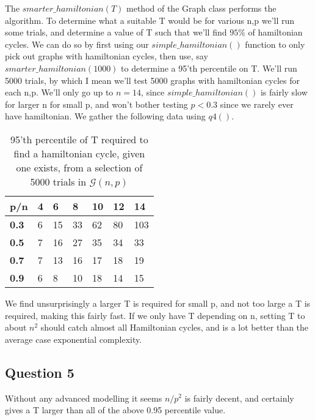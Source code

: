 \documentclass[10pt,a4paper]{report}
\begin{document}
The $smarter\_hamiltonian(T)$ method of the Graph class performs the algorithm. To determine what a suitable T would be for various n,p we'll run some trials, and determine a value of T such that we'll find $95\%$ of hamiltonian cycles. We can do so by first using our $simple\_hamiltonian()$ function to only pick out graphs with hamiltonian cycles, then use, say $smarter\_hamiltonian(1000)$ to determine a 95'th percentile on T. We'll run 5000 trials, by which I mean we'll test 5000 graphs with hamiltonian cycles for each n,p. We'll only go up to $n=14$, since $simple\_hamiltonian()$ is fairly slow for larger n for small p, and won't bother testing $p<0.3$ since we rarely ever have hamiltonian. We gather the following data using $q4()$.

\begin{table}[h]
\centering
\begin{tabular}{|l|l|l|l|l|l|l|}
\hline
\textbf{p/n} & \textbf{4} & \textbf{6} & \textbf{8} & \textbf{10} & \textbf{12} & \textbf{14} \\ \hline
\textbf{0.3} & 6          & 15         & 33         & 62          & 80          & 103         \\ \hline
\textbf{0.5} & 7          & 16         & 27         & 35          & 34          & 33          \\ \hline
\textbf{0.7} & 7          & 13         & 16         & 17          & 18          & 19          \\ \hline
\textbf{0.9} & 6          & 8          & 10         & 18          & 14          & 15          \\ \hline
\end{tabular}
\caption{95'th percentile of T required to find a hamiltonian cycle, given one exists, from a selection of 5000 trials in $\mathcal{G}(n,p)$ }
\label{tab:my-table}
\end{table}

We find unsurprisingly a larger T is required for small p, and not too large a T is required, making this fairly fast. If we only have T depending on n, setting T to about $n^2$ should catch almost all Hamiltonian cycles, and is a lot better than the average case exponential complexity.

\subsection*{Question 5}
Without any advanced modelling it seems $n/p^2$ is fairly decent, and certainly gives a T larger than all of the above 0.95 percentile value.\\
\end{document}
